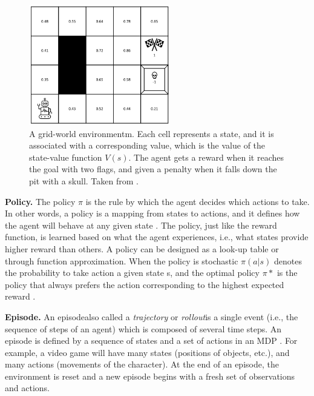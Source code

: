 \begin{figure}[!ht]
    \centering
    \includegraphics[width=0.55\textwidth]{images/gridworld.png}
    \caption{A grid-world environmentm. Each cell represents a state, and it is associated with a corresponding value, which is the value of the state-value function $V(s)$. The agent gets a reward when it reaches the goal with two flags, and given a penalty when it falls down the pit with a skull. Taken from \cite{eriksson2021deep}.
    }
    \label{fig:gridworld}
\end{figure}



\textbf{Policy.}
The policy $\pi$ is the rule by which the agent decides which actions to take. In other words, a policy is a mapping from states to actions, and it defines how the agent will behave at any given state \cite{sutton2018reinforcement}.
The policy, just like the reward function, is learned based on what the agent experiences, i.e., what states provide higher reward than others. A policy can be designed as a look-up table or through function approximation. When the policy is stochastic $\pi(a|s)$ denotes the probability to take action a given state s, and the optimal policy $\pi*$ is the policy that always prefers the action corresponding to the highest expected reward \cite{sutton2018reinforcement}. 


\textbf{Episode.}
An episode\textemdash also called a \textit{trajectory} or \textit{rollout}\textemdash is a single event (i.e., the sequence of steps of an agent) which is composed of several time steps. An episode is defined by a sequence of states and a set of actions in an MDP \cite{sutton2018reinforcement}. For example, a video game will have many states (positions of objects, etc.), and many actions (movements of the character). 
At the end of an episode, the environment is reset and a new episode begins with a fresh set of observations and actions.

